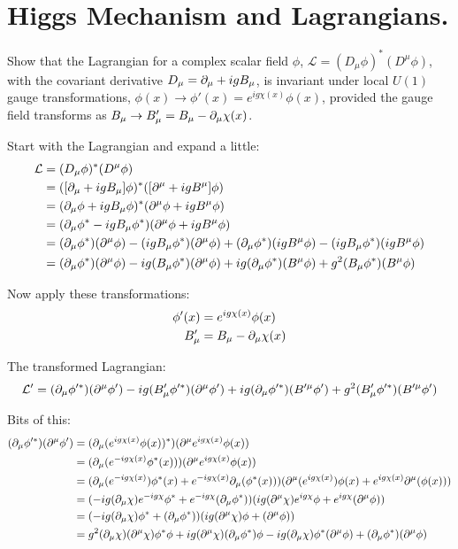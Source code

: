 \section{Higgs Mechanism and Lagrangians.}

Show that the Lagrangian for a complex scalar field $\phi$, $\mathcal{L} = (D_\mu \phi)^* (D^\mu \phi)$, with the covariant derivative $D_\mu = \partial_\mu + igB_\mu$, is invariant under local $U(1)$ gauge transformations, $\phi(x) \to \phi'(x) = e^{ig\chi(x)}\phi(x)$, provided the gauge field transforms as $B_\mu \to B_\mu' = B_\mu - \partial_\mu \chi(x)$.

Start with the Lagrangian and expand a little:
\begin{align*}
    \mathcal{L} &= (D_\mu \phi)^* (D^\mu \phi) \\
    &= ([\partial_\mu + igB_\mu] \phi)^* ([\partial^\mu + igB^\mu] \phi) \\
    &= (\partial_\mu\phi + igB_\mu\phi)^* (\partial^\mu\phi + igB^\mu\phi) \\
    &= (\partial_\mu\phi^* - igB_\mu\phi^*) (\partial^\mu\phi + igB^\mu\phi) \\
    &= (\partial_\mu\phi^*)(\partial^\mu\phi) - (igB_\mu\phi^*) (\partial^\mu\phi) + (\partial_\mu\phi^*)(igB^\mu\phi) - (igB_\mu\phi^*) (igB^\mu\phi) \\
    &= (\partial_\mu\phi^*)(\partial^\mu\phi) - ig (B_\mu\phi^*) (\partial^\mu\phi) + ig(\partial_\mu\phi^*)(B^\mu\phi) + g^2(B_\mu\phi^*) (B^\mu\phi) \\
\end{align*}

Now apply these transformations:
\begin{align*}
    \phi'(x) &= e^{ig\chi(x)}\phi(x)\\
    B_\mu' &= B_\mu - \partial_\mu \chi(x)\\
\end{align*}

The transformed Lagrangian:
\begin{align*}
    \mathcal{L}' &= (\partial_\mu\phi'^*)(\partial^\mu\phi') - ig (B_\mu'\phi'^*) (\partial^\mu\phi') + ig(\partial_\mu\phi'^*)(B'^\mu\phi') + g^2(B'_\mu\phi'^*) (B'^\mu \phi') \\
\end{align*}

\newpage
Bits of this:
\begin{align*}
    (\partial_\mu\phi'^*)(\partial^\mu\phi') &= (\partial_\mu(e^{ig\chi(x)}\phi(x))^*)(\partial^\mu e^{ig\chi(x)}\phi(x))\\
    &= (\partial_\mu(e^{-ig\chi(x)}\phi^*(x)))(\partial^\mu e^{ig\chi(x)}\phi(x)) \\
    &= (\partial_\mu(e^{-ig\chi(x)})\phi^*(x) + e^{-ig\chi(x)}\partial_\mu(\phi^*(x)))(\partial^\mu (e^{ig\chi(x)})\phi(x) + e^{ig\chi(x)}\partial^\mu (\phi(x))) \\
    &= (-ig(\partial_\mu\chi)e^{-ig\chi}\phi^* + e^{-ig\chi}(\partial_\mu \phi^*))(ig(\partial^\mu \chi) e^{ig\chi}\phi + e^{ig\chi} (\partial^\mu \phi)) \\
    &= (-ig(\partial_\mu\chi)\phi^* + (\partial_\mu \phi^*))(ig(\partial^\mu \chi) \phi + (\partial^\mu \phi)) \\
    &= g^2(\partial_\mu\chi)(\partial^\mu \chi) \phi^* \phi + ig(\partial^\mu \chi)(\partial_\mu \phi^*) \phi -ig(\partial_\mu\chi)\phi^*(\partial^\mu \phi) +(\partial_\mu \phi^*)(\partial^\mu \phi) \\
\end{align*}

